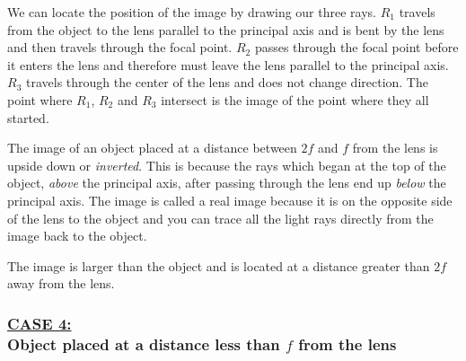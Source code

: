 We can locate the position of the image by drawing our three rays. $R_{1}$ travels from the object to the lens parallel to the principal axis and is bent by the lens and then travels through the focal point. $R_{2}$ passes through the focal point before it enters the lens and therefore must leave the lens parallel to the principal axis. $R_{3}$ travels through the center of the lens and does not change direction. The point where $R_{1}$, $R_{2}$ and $R_{3}$ intersect is the image of the point where they all started.

The image of an object placed at a distance between $2f$ and $f$ from the lens is upside down or \textit{inverted}. This is because the rays which began at the top of the object, \textit{above} the principal axis, after passing through the lens end up \textit{below} the principal axis. The image is called a real image because it is on the opposite side of the lens to the object and you can trace all the light rays directly from the image back to the object.

The image is larger than the object and is located at a distance greater than $2f$ away from the lens.

\subsubsection{\underline{CASE 4:}\\Object placed at a distance less than $f$ from the lens}

